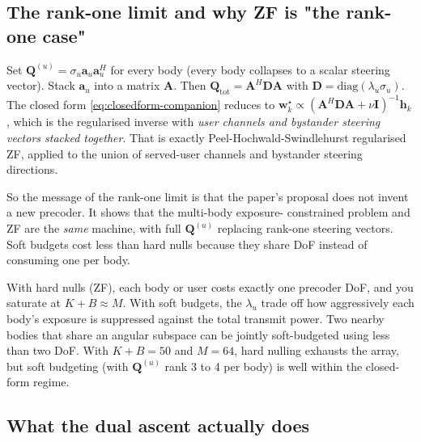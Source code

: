 \documentclass[11pt]{article}
\newenvironment{nb}[1][]{%
  \begin{mdframed}[backgroundcolor=yellow!7,linecolor=yellow!50!black,
    linewidth=0.4pt,roundcorner=2pt,innertopmargin=8pt,
    innerbottommargin=8pt,innerleftmargin=10pt,innerrightmargin=10pt,
    frametitle={\textbf{#1}},frametitlebackgroundcolor=yellow!20]%
}{\end{mdframed}}
\newcommand{\hh}{\mathbf{h}}
\newcommand{\ww}{\mathbf{w}}
\newcommand{\Qmat}{\mathbf{Q}}
\begin{document}
\subsection{The rank-one limit and why ZF is "the rank-one case"}

Set $\Qmat^{(u)} = \sigma_u \mathbf{a}_u \mathbf{a}_u^H$ for every body
(every body collapses to a scalar steering vector). Stack
$\mathbf{a}_u$ into a matrix $\mathbf{A}$. Then
$\Qmat_{\mathrm{tot}} = \mathbf{A}^H \mathbf{D} \mathbf{A}$
with $\mathbf{D} = \mathrm{diag}(\lambda_u \sigma_u)$. The closed form
\eqref{eq:closedform-companion} reduces to
$\ww_k^\star \propto (\mathbf{A}^H \mathbf{D} \mathbf{A} + \nu
\mathbf{I})^{-1} \hh_k$, which is the regularised inverse with
\emph{user channels and bystander steering vectors stacked together}.
That is exactly Peel-Hochwald-Swindlehurst regularised ZF, applied to
the union of served-user channels and bystander steering directions.

So the message of the rank-one limit is that the paper's proposal does
not invent a new precoder. It shows that the multi-body exposure-
constrained problem and ZF are the \emph{same} machine, with full
$\Qmat^{(u)}$ replacing rank-one steering vectors. Soft budgets cost
less than hard nulls because they share DoF instead of consuming one
per body.

\begin{nb}[The "soft budget" part that confused you]
With hard nulls (ZF), each body or user costs exactly one precoder
DoF, and you saturate at $K + B \approx M$. With soft budgets, the
$\lambda_u$ trade off how aggressively each body's exposure is
suppressed against the total transmit power. Two nearby bodies that
share an angular subspace can be jointly soft-budgeted using less than
two DoF. With $K + B = 50$ and $M = 64$, hard nulling exhausts the
array, but soft budgeting (with $\Qmat^{(u)}$ rank 3 to 4 per body)
is well within the closed-form regime.
\end{nb}

\subsection{What the dual ascent actually does}
\end{document}
